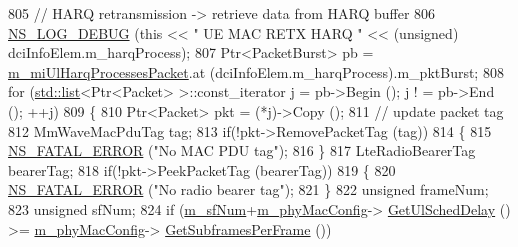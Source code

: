 \begin{DoxyCode}
805                                 \textcolor{comment}{// HARQ retransmission -> retrieve data from HARQ buffer}
806                                 \hyperlink{group__logging_ga413f1886406d49f59a6a0a89b77b4d0a}{NS\_LOG\_DEBUG} (\textcolor{keyword}{this} << \textcolor{stringliteral}{" UE MAC RETX HARQ "} << (\textcolor{keywordtype}{unsigned})
      dciInfoElem.m\_harqProcess);
807                                 Ptr<PacketBurst> pb = \hyperlink{classns3_1_1MmWaveUeMac_a53afd2059b620c2f3dd1d9791c4df83c}{m\_miUlHarqProcessesPacket}.at
       (dciInfoElem.m\_harqProcess).m\_pktBurst;
808                                 \textcolor{keywordflow}{for} (\hyperlink{openflow-interface_8h_afd9bcfa176617760671b67580f536fa7}{std::list}<Ptr<Packet> >::const\_iterator j = pb->Begin (); j !
      = pb->End (); ++j)
809                                 \{
810                                         Ptr<Packet> pkt = (*j)->Copy ();
811                                         \textcolor{comment}{// update packet tag}
812                                         MmWaveMacPduTag tag;
813                                         \textcolor{keywordflow}{if}(!pkt->RemovePacketTag (tag))
814                                         \{
815                                                 \hyperlink{group__fatal_ga5131d5e3f75d7d4cbfd706ac456fdc85}{NS\_FATAL\_ERROR} (\textcolor{stringliteral}{"No MAC PDU tag"});
816                                         \}
817                                         LteRadioBearerTag bearerTag;
818                                         \textcolor{keywordflow}{if}(!pkt->PeekPacketTag (bearerTag))
819                                         \{
820                                                 \hyperlink{group__fatal_ga5131d5e3f75d7d4cbfd706ac456fdc85}{NS\_FATAL\_ERROR} (\textcolor{stringliteral}{"No radio bearer tag"});
821                                         \}
822                                         \textcolor{keywordtype}{unsigned} frameNum;
823                                         \textcolor{keywordtype}{unsigned} sfNum;
824                                         \textcolor{keywordflow}{if} (\hyperlink{classns3_1_1MmWaveUeMac_a6502efe66b636fe976c308a9edac3627}{m\_sfNum}+\hyperlink{classns3_1_1MmWaveUeMac_a24c07c6453f442e2e818803190371a46}{m\_phyMacConfig}->
      \hyperlink{classns3_1_1MmWavePhyMacCommon_afd70935ec71838fefe6a8e18198f19cb}{GetUlSchedDelay} () >= \hyperlink{classns3_1_1MmWaveUeMac_a24c07c6453f442e2e818803190371a46}{m\_phyMacConfig}->
      \hyperlink{classns3_1_1MmWavePhyMacCommon_a3709cf52f6813eb8ad1af16d95082dc1}{GetSubframesPerFrame} ())

\end{DoxyCode}
